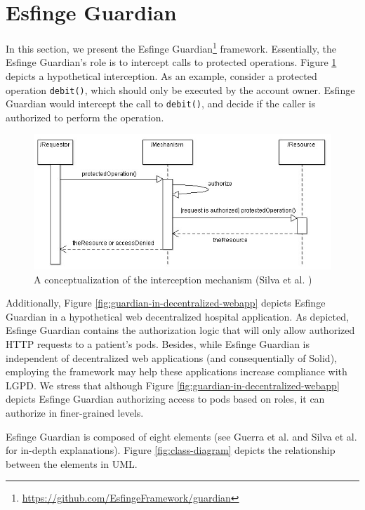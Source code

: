 \documentclass[sigconf]{acmart}
\begin{document}
\section{Esfinge Guardian}

In this section, we present the Esfinge Guardian\footnote{\url{https://github.com/EsfingeFramework/guardian}} framework. Essentially, the Esfinge Guardian's role is to intercept calls to protected operations. Figure \ref{fig:interception-mechanism} depicts a hypothetical interception. As an example, consider a protected operation \verb|debit()|, which should only be executed by the account owner. Esfinge Guardian would intercept the call to \verb|debit()|, and decide if the caller is authorized to perform the operation.

\begin{figure}
 \centering
 \includegraphics[scale=0.5]{interception-mechanism.jpg}
 \caption{A conceptualization of the interception mechanism (Silva et al. \cite{Silva2013})}
 \label{fig:interception-mechanism}
\end{figure}

Additionally, Figure \ref{fig:guardian-in-decentralized-webapp} depicts Esfinge Guardian in a hypothetical web decentralized hospital application. As depicted, Esfinge Guardian contains the authorization logic that will only allow authorized HTTP requests to a patient's pods. Besides, while Esfinge Guardian is independent of decentralized web applications (and consequentially of Solid), employing the framework may help these applications increase compliance with LGPD. We stress that although Figure \ref{fig:guardian-in-decentralized-webapp} depicts Esfinge Guardian authorizing access to pods based on roles, it can authorize in finer-grained levels.

Esfinge Guardian is composed of eight elements (see Guerra et al. \cite{Guerra2015} and Silva et al.\cite{Silva2013} for in-depth explanations). Figure \ref{fig:class-diagram} depicts the relationship between the elements in UML.
\end{document}
